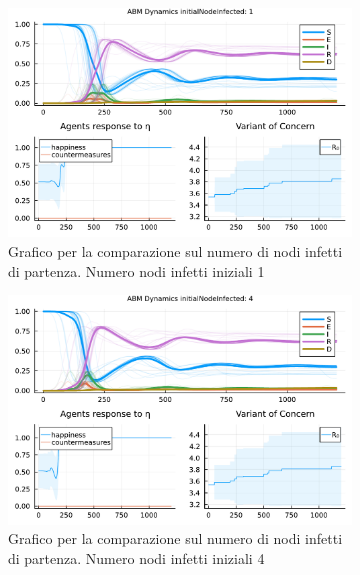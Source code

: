 \begin{figure}[!hb]
	\centering
	\begin{subfigure}[b]{0.45\textwidth}
		\centering
		\includegraphics[width=\textwidth]{img/SocialNetworkABM_1_II.pdf}
		\caption{Grafico per la comparazione sul numero di nodi infetti di partenza. Numero nodi infetti iniziali 1}
		\label{fig:comparison_init_node_inf_1}
	\end{subfigure}
	\hfill
	\begin{subfigure}[b]{0.45\textwidth}
		\centering
		\includegraphics[width=\textwidth]{img/SocialNetworkABM_2_II.pdf}
		\caption{Grafico per la comparazione sul numero di nodi infetti di partenza. Numero nodi infetti iniziali 4}
		\label{fig:comparison_init_node_inf_4}
	\end{subfigure}
	\hfill
	\begin{subfigure}[b]{0.45\textwidth}
		\centering

\end{subfigure}
\end{figure}
